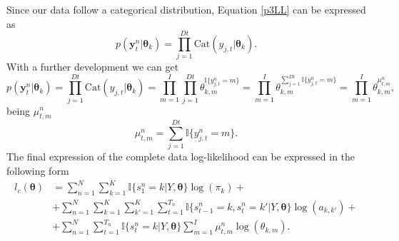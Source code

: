 \documentclass[12pt]{article}
\newcommand{\indicator}{\mathbb{I}}
\begin{document}
\noindent Since our data follow a categorical distribution, Equation \ref{p3LL} can be expressed as
\begin{equation}
p \left( \mathbf { y } _ { t } ^ { n } | \boldsymbol\theta_{k} \right) = \prod\limits_{j=1}^{Dt} \text{Cat}(y_{j,t}|\boldsymbol\theta_{k}).
\end{equation}
With a further development we can get
\begin{equation}
p \left( \mathbf { y } _ { t } ^ { n } | \boldsymbol\theta_{k} \right) = \prod\limits_{j=1}^{Dt} \text{Cat}(y_{j,t}|\boldsymbol\theta_{k}) = \prod\limits_{m=1}^{I}\prod\limits_{j=1}^{Dt}\theta_{k,m}^{\indicator\lbrace{y_{j,t}^{n}=m}\rbrace} = \prod\limits_{m=1}^{I}\theta_{k,m}^{\sum\limits_{j=1}^{Dt}\indicator\lbrace{y_{j,t}^{n}=m}\rbrace} = \prod\limits_{m=1}^{I}\theta_{k,m}^{\mu^{n}_{t,m}},
\end{equation}
being $\mu^{n}_{t,m}$
\begin{equation}
\mu^{n}_{t,m} = \sum\limits_{j=1}^{Dt}\indicator\lbrace{y_{j,t}^{n}=m}\rbrace.
\end{equation}
The final expression of the complete data log-likelihood can be expressed in the following form	
\begin{equation}
\begin{split}
l_{c}\left(\boldsymbol\theta\right) &= \sum\limits_{n=1}^{N}\sum\limits_{k=1}^{K}\indicator \lbrace s_{1}^{n}=k|Y,\boldsymbol\theta\rbrace \log(\pi_{k}) + \\
&+ \sum\limits_{n=1}^{N}\sum\limits_{k=1}^{K}\sum\limits_{k'=1}^{K}\sum\limits_{t=1}^{T_{n}}\indicator \lbrace s_{t-1}^{n}=k,s_{t}^{n}=k'|Y,\boldsymbol\theta\rbrace \log(a_{k,k'}) + \\
&+ \sum\limits_{n=1}^{N}\sum\limits_{t=1}^{T_{n}}\indicator \lbrace s_{t}^{n}=k|Y,\boldsymbol\theta\rbrace \sum\limits_{m=1}^{I}\mu^{n}_{t,m} \log(\theta_{k,m}).
\end{split}
\end{equation}
\end{document}
